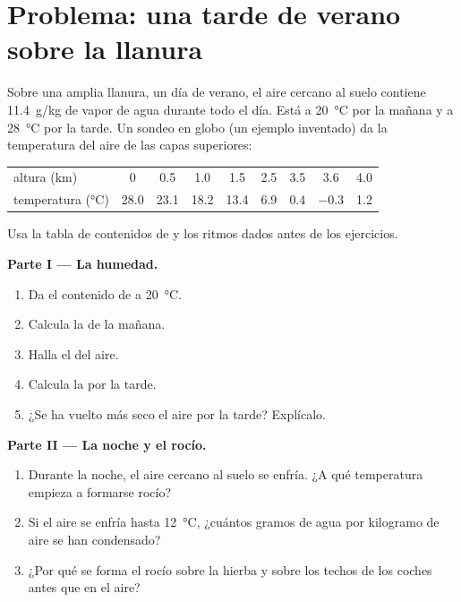 \section{Problema: una tarde de verano sobre la llanura}

\begin{problem}
\label{pb:g10:why-clouds-form:1}
Sobre una amplia llanura, un día de verano, el aire cercano al suelo
contiene \qty{11.4}{g/kg} de vapor de agua durante todo el día. Está a
\qty{20}{\degreeCelsius} por la mañana y a \qty{28}{\degreeCelsius} por la
tarde. Un sondeo en globo (un ejemplo inventado) da la temperatura del aire
de las capas superiores:

\begin{center}
\small
\begin{tabular}{l*{8}{c}}
\hline
altura (km) & 0 & 0.5 & 1.0 & 1.5 & 2.5 & 3.5 & 3.6 & 4.0 \\
temperatura (\unit{\degreeCelsius}) & 28.0 & 23.1 & 18.2 & 13.4 & 6.9 & 0.4 & $-0.3$ & 1.2 \\
\hline
\end{tabular}
\end{center}

\noindent Usa la tabla de contenidos de  y los ritmos dados antes
de los ejercicios.

\medskip
\noindent\textbf{Parte I --- La humedad.}
\begin{enumerate}
  \item Da el contenido de  a \qty{20}{\degreeCelsius}.
  \item Calcula la  de la mañana.
  \item Halla el  del aire.
  \item Calcula la  por la tarde.
  \item ¿Se ha vuelto más seco el aire por la tarde? Explícalo.
\end{enumerate}

\medskip
\noindent\textbf{Parte II --- La noche y el rocío.}
\begin{enumerate}[resume]
  \item Durante la noche, el aire cercano al suelo se enfría. ¿A qué
        temperatura empieza a formarse rocío?
  \item Si el aire se enfría hasta \qty{12}{\degreeCelsius}, ¿cuántos gramos
        de agua por kilogramo de aire se han condensado?
  \item ¿Por qué se forma el rocío sobre la hierba y sobre los techos de los
        coches antes que en el aire?
\end{enumerate}


\end{problem}
